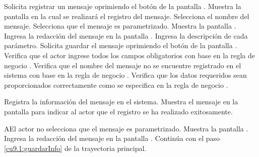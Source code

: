  \begin{UCtrayectoria}
    \UCpaso[\UCactor] Solicita registrar un mensaje oprimiendo el botón  de la pantalla .
    \UCpaso[\UCsist] Muestra la pantalla  en la cual se realizará el registro del mensaje.
    \UCpaso[\UCactor] Selecciona el nombre del mensaje. \label{cu8:ingresaDatos}
    \UCpaso[\UCactor] Selecciona que el mensaje es parametrizado. 
    \UCpaso[\UCsist] Muestra la pantalla .
    \UCpaso[\UCactor] Ingresa la redacción del mensaje en la pantalla .  \label{cu9.1:ingresaParam}
    \UCpaso[\UCactor] Ingresa la descripción de cada parámetro.        \label{cu9.1:ingresaPaso}
    \UCpaso[\UCactor] Solicita guardar el mensaje oprimiendo el botón  de la pantalla .  \label{cu9.1:guardarInfo}
    \UCpaso[\UCsist] Verifica que el actor ingrese todos los campos obligatorios con base en la regla de negocio  . 
    \UCpaso[\UCsist] Verifica que el nombre del mensaje no se encuentre registrado en el sistema con base en la regla de negocio  . 
    \UCpaso[\UCsist] Verifica que los datos requeridos sean proporcionados correctamente como se especifica en la regla de negocio . 
    
    \UCpaso[\UCsist] Registra la información del mensaje en el sistema.
    \UCpaso[\UCsist] Muestra el mensaje  en la pantalla 
    para indicar al actor que el registro se ha realizado exitosamente.
 \end{UCtrayectoria}
 
 
 \begin{UCtrayectoriaA}{A}{El actor no selecciona que el mensaje es parametrizado.}
	\UCpaso[\UCsist] Muestra la pantalla .
	\UCpaso[\UCactor] Ingresa la redacción del mensaje en la pantalla .
	\UCpaso[] Continúa con el paso \ref{cu9.1:guardarInfo} de la trayectoria principal.
 \end{UCtrayectoriaA}
 
